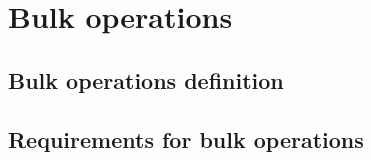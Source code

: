 \chapter{Bulk operations}

\section{Bulk operations definition}

\section{Requirements for bulk operations}

